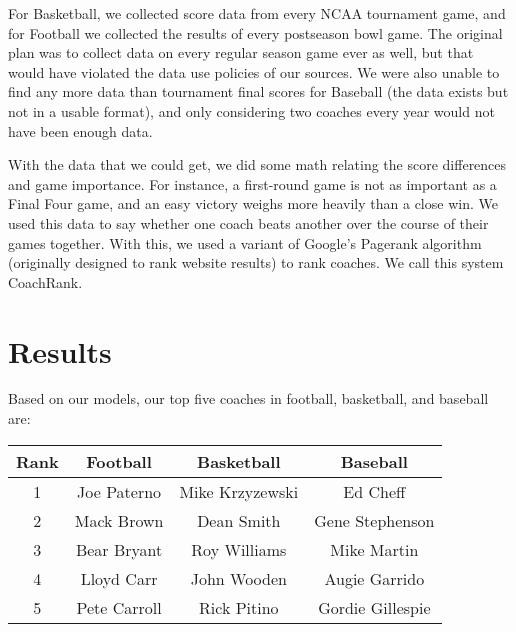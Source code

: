 \documentclass[12pt]{article}
\begin{document}
For Basketball, we collected score data from every NCAA tournament game, and for Football we collected the results of every postseason bowl game. The original plan was to collect data on every regular season game ever as well, but that would have violated the data use policies of our sources. We were also unable to find any more data than tournament final scores for Baseball (the data exists but not in a usable format), and only considering two coaches every year would not have been enough data.

With the data that we could get, we did some math relating the score differences and game importance. For instance, a first-round game is not as important as a Final Four game, and an easy victory weighs more heavily than a close win. We used this data to say whether one coach beats another over the course of their games together. With this, we used a variant of Google's Pagerank algorithm (originally designed to rank website results) to rank coaches. We call this system CoachRank.


\section{Results}
Based on our models, our top five coaches in football, basketball, and baseball are:
\begin{center}
\begin{tabular}{c | c | c | c}
Rank & Football & Basketball & Baseball\\\hline
1 & Joe Paterno  & Mike Krzyzewski & Ed Cheff \\
2 & Mack Brown   & Dean Smith      & Gene Stephenson\\
3 & Bear Bryant  & Roy Williams    & Mike Martin\\
4 & Lloyd Carr   & John Wooden     & Augie Garrido\\
5 & Pete Carroll & Rick Pitino     & Gordie Gillespie\\
\end{tabular}
\end{center}
\end{document}
